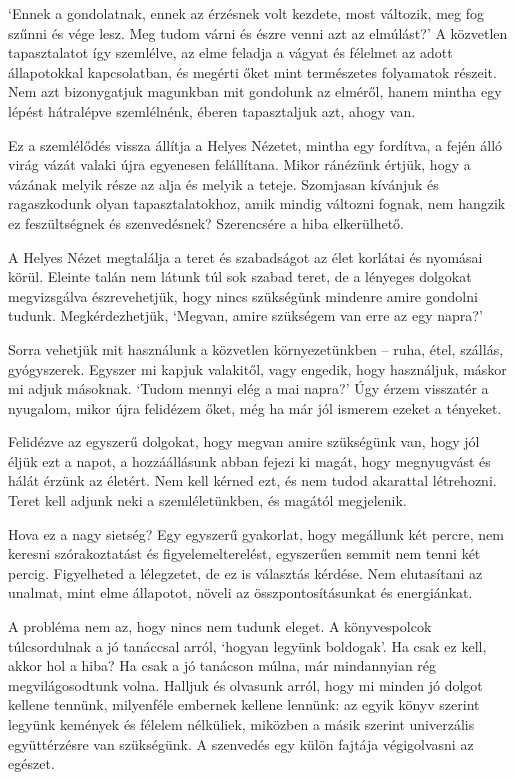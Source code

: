 `Ennek a gondolatnak, ennek az érzésnek volt kezdete, most változik, meg
fog szűnni és vége lesz. Meg tudom várni és észre venni azt az
elmúlást?' A közvetlen tapasztalatot így szemlélve, az elme feladja a
vágyat és félelmet az adott állapotokkal kapcsolatban, és megérti őket
mint természetes folyamatok részeit. Nem azt bizonygatjuk magunkban mit
gondolunk az elméről, hanem mintha egy lépést hátralépve szemlélnénk,
éberen tapasztaljuk azt, ahogy van.

Ez a szemlélődés vissza állítja a Helyes Nézetet, mintha egy fordítva, a
fején álló virág vázát valaki újra egyenesen felállítana. Mikor ránézünk
értjük, hogy a vázának melyik része az alja és melyik a teteje.
Szomjasan kívánjuk és ragaszkodunk olyan tapasztalatokhoz, amik mindig
változni fognak, nem hangzik ez feszültségnek és szenvedésnek?
Szerencsére a hiba elkerülhető.


A Helyes Nézet megtalálja a teret és szabadságot az élet korlátai és
nyomásai körül. Eleinte talán nem látunk túl sok szabad teret, de a
lényeges dolgokat megvizsgálva észrevehetjük, hogy nincs szükségünk
mindenre amire gondolni tudunk. Megkérdezhetjük, `Megvan, amire
szükségem van erre az egy napra?'

Sorra vehetjük mit használunk a közvetlen környezetünkben -- ruha, étel,
szállás, gyógyszerek. Egyszer mi kapjuk valakitől, vagy engedik, hogy
használjuk, máskor mi adjuk másoknak. `Tudom mennyi elég a mai napra?'
Úgy érzem visszatér a nyugalom, mikor újra felidézem őket, még ha már
jól ismerem ezeket a tényeket.

Felidézve az egyszerű dolgokat, hogy megvan amire szükségünk van, hogy
jól éljük ezt a napot, a hozzáállásunk abban fejezi ki magát, hogy
megnyugvást és hálát érzünk az életért. Nem kell kérned ezt, és nem
tudod akarattal létrehozni. Teret kell adjunk neki a szemléletünkben, és
magától megjelenik.

Hova ez a nagy sietség? Egy egyszerű gyakorlat, hogy megállunk két
percre, nem keresni szórakoztatást és figyelemelterelést, egyszerűen
semmit nem tenni két percig. Figyelheted a lélegzetet, de ez is
választás kérdése. Nem elutasítani az unalmat, mint elme állapotot,
növeli az összpontosításunkat és energiánkat.

A probléma nem az, hogy nincs nem tudunk eleget. A könyvespolcok
túlcsordulnak a jó tanáccsal arról, `hogyan legyünk boldogak'. Ha csak
ez kell, akkor hol a hiba? Ha csak a jó tanácson múlna, már mindannyian
rég megvilágosodtunk volna. Halljuk és olvasunk arról, hogy mi minden jó
dolgot kellene tennünk, milyenféle embernek kellene lennünk: az egyik
könyv szerint legyünk kemények és félelem nélküliek, miközben a másik
szerint univerzális együttérzésre van szükségünk. A szenvedés egy külön
fajtája végigolvasni az egészet.

